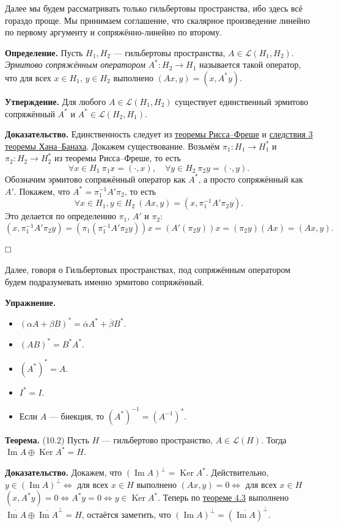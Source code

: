 \documentclass[12pt, a4paper]{article}
\DeclareMathOperator{\im}{Im}
\DeclareMathOperator{\Ker}{Ker}
\newcommand{\QED}{$\hfill\square$}
\begin{document}
Далее мы будем рассматривать только гильбертовы пространства, ибо здесь всё гораздо проще. Мы принимаем соглашение, что скалярное произведение линейно по первому аргументу и сопряжённо-линейно по второму.

\textbf{Определение.} Пусть $H_1, H_2$ --- гильбертовы пространства, $A \in \mathcal L(H_1, H_2)$.
\textit{Эрмитово сопряжённым оператором} $A^*: H_2 \to H_1$ называется такой оператор, что для всех $x \in H_1$, $y \in H_2$ выполнено $(Ax, y) = (x, A^* y)$.

\textbf{Утверждение.} Для любого $A \in \mathcal{L}(H_1, H_2)$ существует единственный эрмитово сопряжённый $A^*$ и $A^* \in \mathcal{L}(H_2, H_1)$.

\textbf{Доказательство.} Единственность следует из \hyperref[th:6-1]{теоремы Рисса--Фреше} и \hyperref[th:hahn-banach-coll-3]{следствия 3 теоремы Хана--Банаха}. Докажем существование. Возьмём $\pi_1 \colon H_1 \to H_1^*$ и $\pi_2 \colon H_2 \to H_2^*$ из теоремы Рисса--Фреше, то есть
\[
    \forall x \in H_1 \ \pi_1 x = (\cdot, x), \quad \forall y \in H_2 \ \pi_2 y = (\cdot, y).
\]
Обозначим эрмитово сопряжённый оператор как $A^*$, а просто сопряжённый как $A'$. Покажем, что $A^* = \pi_1^{-1}A'\pi_2$, то есть
\[
    \forall x \in H_1, y \in H_2 \ (Ax, y) = (x, \pi_1^{-1}A'\pi_2 y).
\]
Это делается по определению $\pi_1$, $A'$ и $\pi_2$:
\[
    (x, \pi_1^{-1}A'\pi_2 y) = (\pi_1(\pi_1^{-1}A'\pi_2 y))x = (A'(\pi_2y))x = (\pi_2y)(Ax) = (Ax, y).
\]

\QED

Далее, говоря о Гильбертовых пространствах, под сопряжённым оператором будем подразумевать именно эрмитово сопряжённый.

\textbf{Упражнение.}
\begin{itemize}
    \item $(\alpha A + \beta B)^* = \overline \alpha A^* + \overline \beta B^*$.
    \item $(AB)^* = B^* A^*$.
    \item $(A^*)^* = A$.
    \item $I^* = I$.
    \item Если $A$ --- биекция, то $(A^*)^{-1} = (A^{-1})^*$.
\end{itemize}

 \label{th:10-2} \textbf{Теорема.} (10.2) Пусть $H$ --- гильбертово пространство, $A \in \mathcal L(H)$.
Тогда $\overline{\im A} \oplus \Ker A^* = H$.

\textbf{Доказательство.} Докажем, что $(\im A)^\bot = \Ker A^*$.
Действительно, $y \in (\im A)^\bot \Leftrightarrow$ для всех $x \in H$ выполнено $(Ax, y) = 0 \Leftrightarrow$ для всех $x \in H$ $(x, A^* y) = 0 \Leftrightarrow A^* y = 0 \Leftrightarrow y \in \Ker A^*$.
Теперь по \hyperref[th:4-3]{теореме 4.3} выполнено $\overline{\im A} \oplus \overline{\im A}^\bot = H$, остаётся заметить, что $(\im A)^\bot = (\overline{\im A})^\bot$.
\end{document}
